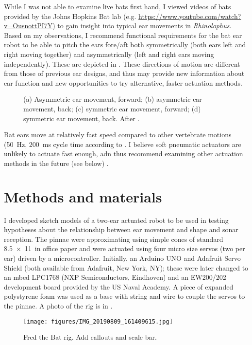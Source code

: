 \documentclass{article}
\begin{document}
While I was not able to examine live bats first hand, I viewed videos of bats provided by the Johns Hopkins Bat lab (e.g. \url{https://www.youtube.com/watch?v=OusnottPI7Y}) to gain insight into typical ear movements in \emph{Rhinolophus}. Based on my observations, I recommend functional requirements for the bat ear robot to be able to pitch the ears fore/aft both symmetrically (both ears left and right moving together) and asymmetrically (left and right ears moving independently). These are depicted in . These directions of motion are different from those of previous ear designs, and thus may provide new information about ear function and new opportunities to try alternative, faster actuation methods. 
\begin{figure}[h]
\caption{(a) Asymmetric ear movement, forward; (b) asymmetric ear movement, back; (c) symmetric ear movement, forward; (d) symmetric ear movement, back. After \citep{pannala2013investigation}.}
\label{fig:2}
\end{figure}

Bat ears move at relatively fast speed compared to other vertebrate motions (\SI{50}{\hertz}, \SI{200}{\milli\second} cycle time according to \cite{pannala2013interplay}. I believe soft pneumatic actuators are unlikely to actuate fast enough, adn thus recommend examining other actuation methods in the future (see below) \citep{hines2017soft}. 





\section{Methods and materials}
I developed sketch models of a two-ear actuated robot to be used in testing hypotheses about the relationship between ear movement and shape and sonar reception. The pinnae were approximating using simple cones of standard \SI{8.5x11}{in} office paper and were actuated using four micro size servos (two per ear) driven by a microcontroller. Initially, an Arduino UNO and Adafruit Servo Shield (both available from Adafruit, New York, NY); these were later changed to an mbed LPC1768 (NXP Semiconductors, Eindhoven) and an EW200/202 development board provided by the US Naval Academy. A piece of expanded polystyrene foam was used as a base with string and wire to couple the servos to the pinnae. A photo of the rig is in .
\begin{figure}[h]
\begin{center}
\texttt{[image: figures/IMG\_20190809\_161409615.jpg]}
\end{center}
\caption{Fred the Bat rig. Add callouts and scale bar.}
\label{fig:3}
\end{figure}
\end{document}
